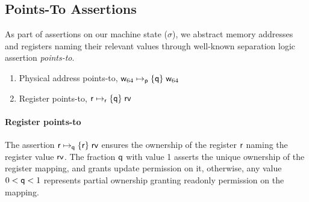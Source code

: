 \subsection{Points-To Assertions}
\label{sec:pointsto}
As part of assertions on our machine state ($\sigma$), we abstract memory addresses and registers naming their relevant values through well-known separation logic assertion \textit{points-to}.
\begin{enumerate}
\item Physical address points-to, $\mathsf{w}_{64}\mapsto_{\mathsf{p}}\{\mathsf{q}\}\;\mathsf{w}_{64}$
\item Register points-to, $\mathsf{r}\mapsto_{\mathsf{r}}\{\mathsf{q}\}\;\mathsf{rv}$
\end{enumerate}
\paragraph{Register points-to} The assertion $\mathsf{r}\mapsto_{\mathsf{q}}\{\mathsf{r}\}\;\mathsf{rv}$ ensures the ownership of the register $\mathsf{r}$ naming the register value $\mathsf{rv}$. The fraction $\mathsf{q}$ with value 1 asserts the unique ownership of the register mapping, and grants update permission on it, otherwise, any value $0 < \mathsf{q} <1$ represents partial ownership granting readonly permission on the mapping.
